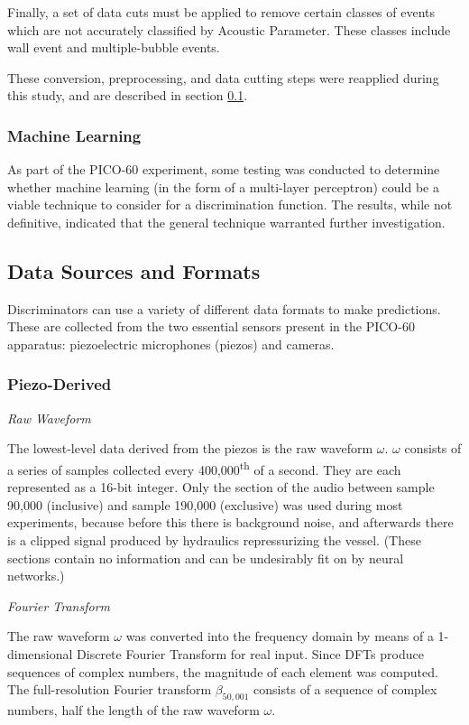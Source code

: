 \documentclass[10pt]{article}
\begin{document}
Finally, a set of data cuts must be applied to remove certain classes of events which are not accurately classified by Acoustic Parameter. These classes include wall event and multiple-bubble events.

These conversion, preprocessing, and data cutting steps were reapplied during this study, and are described in section \ref{data_formats}.

\subsubsection{Machine Learning}

As part of the PICO-60 experiment, some testing was conducted to determine whether machine learning (in the form of a multi-layer perceptron) could be a viable technique to consider for a discrimination function. The results, while not definitive, indicated that the general technique warranted further investigation.

\subsection{Data Sources and Formats} \label{data_formats}

Discriminators can use a variety of different data formats to make predictions. These are collected from the two essential sensors present in the PICO-60 apparatus: piezoelectric microphones (piezos) and cameras.

\subsubsection{Piezo-Derived}

\textit{Raw Waveform}

The lowest-level data derived from the piezos is the raw waveform $\omega$. $\omega$ consists of a series of samples collected every 400,000\textsuperscript{th} of a second. They are each represented as a 16-bit integer. Only the section of the audio between sample 90,000 (inclusive) and sample 190,000 (exclusive) was used during most experiments, because before this there is background noise, and afterwards there is a clipped signal produced by hydraulics repressurizing the vessel. (These sections contain no information and can be undesirably fit on by neural networks.)

\textit{Fourier Transform}

The raw waveform $\omega$ was converted into the frequency domain by means of a 1-dimensional Discrete Fourier Transform for real input. Since DFTs produce sequences of complex numbers, the magnitude of each element was computed. The full-resolution Fourier transform $\beta _{50,001}$ consists of a sequence of complex numbers, half the length of the raw waveform $\omega$.
\end{document}
